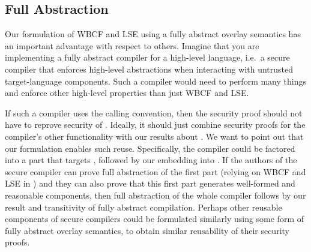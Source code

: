\subsection{Full Abstraction}
Our formulation of WBCF and LSE using a fully abstract overlay semantics has an important advantage with respect to others.
Imagine that you are implementing a fully abstract compiler for a high-level language, i.e.\ a secure compiler that enforces high-level abstractions when interacting with untrusted target-language components.
Such a compiler would need to perform many things and enforce other high-level properties than just WBCF and LSE.

If such a compiler uses the \stktokens{} calling convention, then the security proof should not have to reprove security of \stktokens{}.
Ideally, it should just combine security proofs for the compiler's other functionality with our results about \stktokens{}.
We want to point out that our formulation enables such reuse.
Specifically, the compiler could be factored into a part that targets \srccm{}, followed by our embedding into \trgcm{}.
If the authors of the secure compiler can prove full abstraction of the first part (relying on WBCF and LSE in \srccm{}) and they can also prove that this first part generates well-formed and reasonable components, then full abstraction of the whole compiler follows by our result and transitivity of fully abstract compilation.
Perhaps other reusable components of secure compilers could be formulated similarly using some form of fully abstract overlay semantics, to obtain similar reusability of their security proofs.



